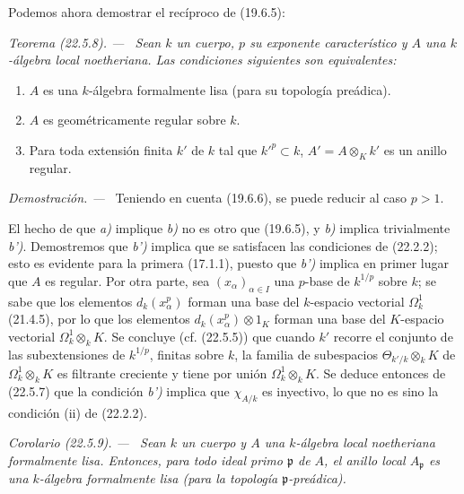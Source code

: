 \documentclass[10pt,oneside]{book}
\makeatletter
\newcommand{\setmanualcurrentlabel}[1]{\def\@currentlabel{#1}}
\newenvironment{theorem}[1][]{%
  \setmanualcurrentlabel{#1}\par\medskip\noindent\itshape Teorema (#1). ---\ }{\par}
\newenvironment{corollary}[1][]{%
  \setmanualcurrentlabel{#1}\par\medskip\noindent\itshape Corolario (#1). ---\ }{\par}
\newenvironment{proof}{%
  \par\medskip\noindent\textit{Demostración. ---\ }}{\par}
\makeatother
\begin{document}
Podemos ahora demostrar el recíproco de (19.6.5):

\begin{theorem}[22.5.8]
\label{0.22.5.8-es}
Sean $k$ un cuerpo, $p$ su exponente característico y $A$ una $k$-álgebra
local noetheriana. Las condiciones siguientes son equivalentes:
\begin{enumerate}
  \item[\textup{a)}] $A$ es una $k$-álgebra formalmente lisa (para su topología
  preádica).
  \item[\textup{b)}] $A$ es geométricamente regular sobre $k$.
  \item[\textup{b')}] Para toda extensión finita $k'$ de $k$ tal que $k'^p\subset k$,
  $A'=A\otimes_Kk'$ es un anillo regular.
\end{enumerate}
\end{theorem}

\begin{proof}
Teniendo en cuenta (19.6.6), se puede reducir al caso $p>1$.

El hecho de que \emph{a)} implique \emph{b)} no es otro que (19.6.5), y \emph{b)} implica
trivialmente \emph{b')}. Demostremos que \emph{b')} implica que se satisfacen las condiciones de
(22.2.2); esto es evidente para la primera (17.1.1), puesto que \emph{b')} implica
en primer lugar que $A$ es regular. Por otra parte, sea $(x_\alpha)_{\alpha\in I}$ una
$p$-base de $k^{1/p}$ sobre $k$; se sabe que los elementos $d_k(x_\alpha^p)$
forman una base del $k$-espacio vectorial $\Omega^1_k$ (21.4.5), por lo que los
elementos $d_k(x_\alpha^p)\otimes1_K$ forman una base del $K$-espacio vectorial
$\Omega^1_k\otimes_kK$. Se concluye (cf. (22.5.5)) que cuando $k'$ recorre
el conjunto de las subextensiones de $k^{1/p}$, finitas sobre $k$, la familia de
subespacios $\Theta_{k'/k}\otimes_kK$ de $\Omega^1_k\otimes_kK$ es filtrante
creciente y tiene por unión $\Omega^1_k\otimes_kK$. Se deduce entonces de
(22.5.7) que la condición \emph{b')} implica que $\chi_{A/k}$ es inyectivo, lo que
no es sino la condición (ii) de (22.2.2).
\end{proof}

\begin{corollary}[22.5.9]
\label{0.22.5.9-es}
Sean $k$ un cuerpo y $A$ una $k$-álgebra local noetheriana formalmente
lisa. Entonces, para todo ideal primo $\mathfrak p$ de $A$, el anillo local
$A_{\mathfrak p}$ es una $k$-álgebra formalmente lisa (para la topología
$\mathfrak p$-preádica).
\end{corollary}
\end{document}
